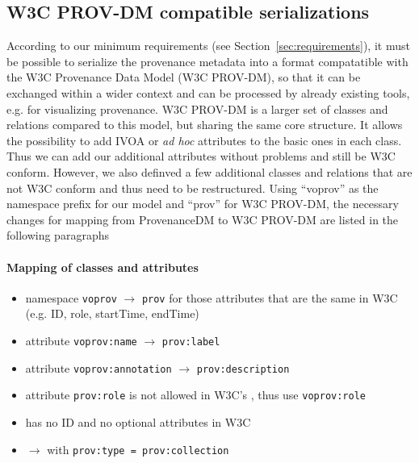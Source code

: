 \subsection{W3C PROV-DM compatible serializations}\label{sec:w3cserialization}
According to our minimum requirements (see Section~\ref{sec:requirements}), it must be possible to
serialize the provenance metadata into a format compatatible with the W3C Provenance Data Model (W3C PROV-DM), so that it can be exchanged within a wider context and can be processed by already existing tools, e.g. for visualizing provenance.
W3C PROV-DM is a larger set of classes and relations compared to this model, but sharing the same core structure. It allows the possibility to add IVOA or \textit{ad hoc} attributes to the basic ones in each class. Thus we can add our additional attributes without problems and still be W3C conform. However, we also definved a few additional classes and relations that are not W3C conform and thus need to be restructured.
Using ``voprov'' as the namespace prefix for our model and ``prov'' for W3C PROV-DM, the necessary changes for mapping from ProvenanceDM to W3C PROV-DM are listed in the following paragraphs

\paragraph{Mapping of classes and attributes}
\begin{itemize}
\item namespace \texttt{voprov} $\rightarrow$ \texttt{prov} for those attributes that are the same in W3C (e.g. ID, role, startTime, endTime)
\item attribute \texttt{voprov:name} $\rightarrow$ \texttt{prov:label}
\item attribute \texttt{voprov:annotation} $\rightarrow$ \texttt{prov:description}
\item attribute \texttt{prov:role} is not allowed in W3C's , thus use \texttt{voprov:role}
\item {} has no ID and no optional attributes in W3C
\item {} $\rightarrow$  with \texttt{prov:type = prov:collection}
\end{itemize}

